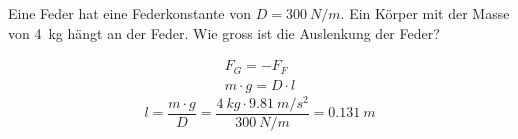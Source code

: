 
\begin{aufgabe}
Eine Feder hat eine Federkonstante von $D=\SI{300}{N/m}$. Ein Körper
mit der Masse von \SI{4}{kg} hängt an der Feder. Wie gross ist die Auslenkung
der Feder?

\begin{loesung}
\begin{gather*}
F_G=-F_F\\
m\cdot g = D\cdot l
\end{gather*}
\begin{equation*}
    l = \frac{m\cdot g}{D}=\frac{\SI{4}{kg}\cdot \SI{9.81}{m/s^2}}{\SI{300}{N/m}}=\SI{0.131}{m}
\end{equation*}
\end{loesung}
\end{aufgabe}


